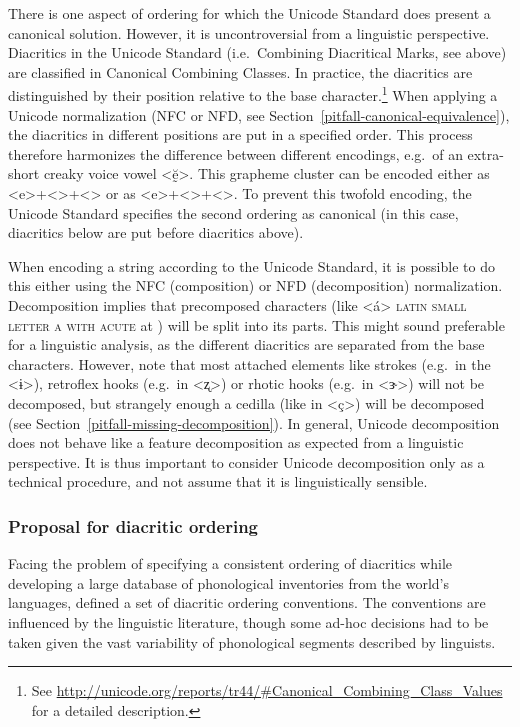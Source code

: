 There is one aspect of ordering for which the Unicode Standard does present a
canonical solution. However, it is uncontroversial from a linguistic
perspective. Diacritics in the Unicode Standard (i.e.~Combining Diacritical
Marks, see above) are classified in Canonical Combining Classes. In practice,
the diacritics are distinguished by their position relative to the base
character.\footnote{See
\url{http://unicode.org/reports/tr44/\#Canonical\_Combining\_Class\_Values} for a
detailed description.} When applying a Unicode normalization (NFC or NFD, see
Section~\ref{pitfall-canonical-equivalence}), the diacritics in different
positions are put in a specified order. This process therefore harmonizes the
difference between different encodings, e.g.\ of an extra-short creaky voice
vowel <ḛ̆>. This grapheme cluster can be encoded either as
<e>+<>+<> or as <e>+<>+<>. To
prevent this twofold encoding, the Unicode Standard specifies the second
ordering as canonical (in this case, diacritics below are put before diacritics
above).

When encoding a string according to the Unicode Standard, it is possible to do
this either using the NFC (composition) or NFD (decomposition) normalization.
Decomposition implies that precomposed characters (like <á> \textsc{latin small
letter a with acute} at ) will be split into its parts. This might
sound preferable for a linguistic analysis, as the different diacritics are
separated from the base characters. However, note that most attached elements
like strokes (e.g.~in the <ɨ>), retroflex hooks (e.g.~in <ʐ>) or rhotic hooks
(e.g.~in <ɝ>) will not be decomposed, but strangely enough a cedilla (like in
<ç>) will be decomposed (see Section~\ref{pitfall-missing-decomposition}). In
general, Unicode decomposition does not behave like a feature decomposition as
expected from a linguistic perspective. It is thus important to consider Unicode
decomposition only as a technical procedure, and not assume that it is
linguistically sensible.

\subsubsection*{Proposal for diacritic ordering}

Facing the problem of specifying a consistent ordering of diacritics while
developing a large database of phonological inventories from the world's
languages, \citet[540]{Moran2012} defined a set of diacritic ordering
conventions. The conventions are influenced by the linguistic literature, though
some ad-hoc decisions had to be taken given the vast variability of phonological
segments described by linguists. 

